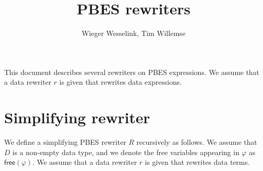 \documentclass{article}
\begin{document}
\title{PBES rewriters}
\author{Wieger Wesselink, Tim Willemse}
\maketitle

This document describes several rewriters on PBES expressions. We assume that a data
rewriter $r$ is given that rewrites data expressions.

\section{Simplifying rewriter}

We define a simplifying PBES rewriter $R$ recursively as follows. We assume
that $D$ is a non-empty data type, and we denote the free variables
appearing in $\varphi $ as $\mathsf{free}(\varphi )$. We assume that a data
rewriter $r$ is given that rewrites data terms.%
\end{document}
